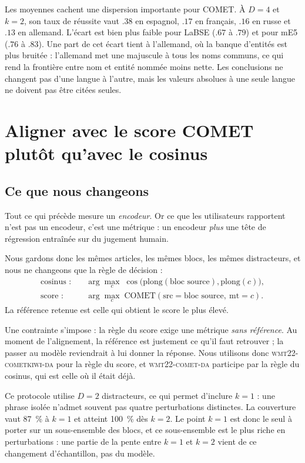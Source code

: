 \documentclass[11pt]{article}
\newcommand{\cometda}{\textsc{wmt22-comet-da}}
\newcommand{\kiwi}{\textsc{wmt22-cometkiwi-da}}
\begin{document}
Les moyennes cachent une dispersion importante pour COMET.
À $D=4$ et $k=2$, son taux de réussite vaut $.38$ en espagnol, $.17$ en français, $.16$ en russe et $.13$ en allemand.
L'écart est bien plus faible pour LaBSE ($.67$ à $.79$) et pour mE5 ($.76$ à $.83$).
Une part de cet écart tient à l'allemand, où la banque d'entités est plus bruitée : l'allemand met une majuscule à tous les noms communs, ce qui rend la frontière entre nom et entité nommée moins nette.
Les conclusions ne changent pas d'une langue à l'autre, mais les valeurs absolues à une seule langue ne doivent pas être citées seules.

\section{Aligner avec le score COMET plutôt qu'avec le cosinus}

\subsection{Ce que nous changeons}

Tout ce qui précède mesure un \emph{encodeur}.
Or ce que les utilisateurs rapportent n'est pas un encodeur, c'est une métrique : un encodeur \emph{plus} une tête de régression entraînée sur du jugement humain.

Nous gardons donc les mêmes articles, les mêmes blocs, les mêmes distracteurs, et nous ne changeons que la règle de décision :
\begin{align*}
\text{cosinus :} \quad & \arg\max_c \; \cos\big(\mathrm{plong}(\text{bloc source}), \mathrm{plong}(c)\big),\\
\text{score :} \quad & \arg\max_c \; \mathrm{COMET}(\text{src} = \text{bloc source},\ \text{mt} = c).
\end{align*}
La référence retenue est celle qui obtient le score le plus élevé.

Une contrainte s'impose : la règle du score exige une métrique \emph{sans référence}.
Au moment de l'alignement, la référence est justement ce qu'il faut retrouver ; la passer au modèle reviendrait à lui donner la réponse.
Nous utilisons donc \kiwi{} \citep{rei2022cometkiwi} pour la règle du score, et \cometda{} participe par la règle du cosinus, qui est celle où il était déjà.

Ce protocole utilise $D=2$ distracteurs, ce qui permet d'inclure $k=1$ : une phrase isolée n'admet souvent pas quatre perturbations distinctes.
La couverture vaut 87~\% à $k=1$ et atteint 100~\% dès $k=2$.
Le point $k=1$ est donc le seul à porter sur un sous-ensemble des blocs, et ce sous-ensemble est le plus riche en perturbations : une partie de la pente entre $k=1$ et $k=2$ vient de ce changement d'échantillon, pas du modèle.
\end{document}
